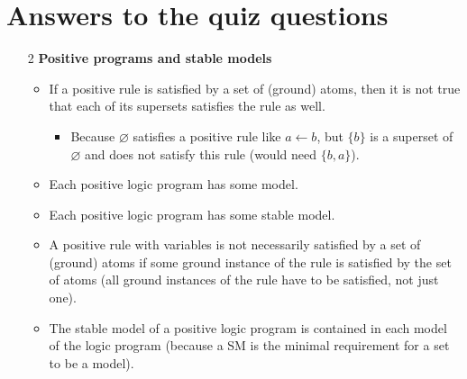 \documentclass[9pt,a4paper,landscape]{article}
\begin{document}
{\pagebreak



\section{Answers to the quiz questions}

\begin{itemize}
	
	\item[2] \textbf{Positive programs and stable models}
	\begin{itemize}[noitemsep]
		\item If a positive rule is satisfied by a set of (ground) atoms, then it is not true that each of its supersets satisfies the rule as well.
		\begin{itemize}[noitemsep]
			\item Because $\varnothing$ satisfies a positive rule like $a \leftarrow b$, but $\{b\}$ is a superset of $\varnothing$ and does not satisfy this rule (would need $\{b, a\}$).
		\end{itemize}
		\item Each positive logic program has some model.
		\item Each positive logic program has some stable model.
		\item A positive rule with variables is not necessarily satisfied by a set of (ground) atoms if some ground instance of the rule is satisfied by the set of atoms (all ground instances of the rule have to be satisfied, not just one).
		\item The stable model of a positive logic program is contained in each model of the logic program (because a SM is the minimal requirement for a set to be a model).
	\end{itemize}
	

\end{itemize}}
\end{document}
